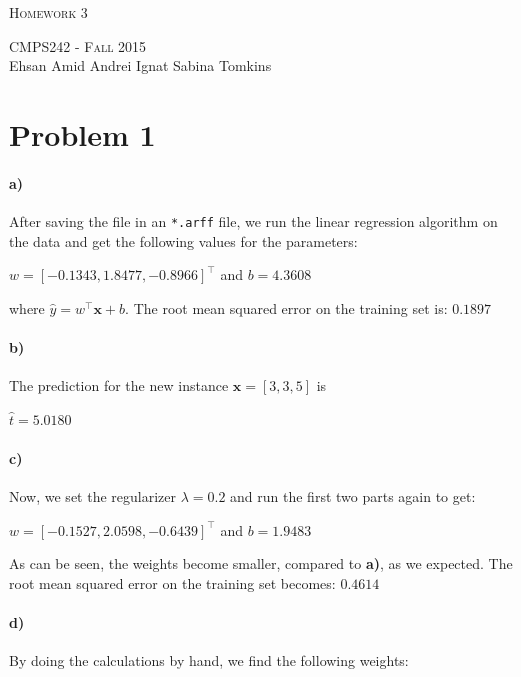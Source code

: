 \documentclass{article}
\begin{document}
\begin{center}
\Huge{\textsc{Homework 3}} 

\Large\textsc{CMPS242 - Fall 2015}\\

\large{Ehsan Amid \hfill Andrei Ignat  \hfill Sabina Tomkins} 
\end{center}

\section{Problem 1}

\paragraph{a)} After saving the file in an \texttt{*.arff} file, we run the linear regression algorithm on the data and get the following values for the parameters:

\begin{center}
$w = [-0.1343, 1.8477,  -0.8966]^\top$ and $b = 4.3608$ 
\end{center}
where $\hat{y} = w^\top \mathbf{x} + b$. The root mean squared error on the training set is: $0.1897$\newline

\paragraph{b)} The prediction for the new instance $\mathbf{x} = [3, 3, 5]$ is

\begin{center}
$\hat{t} = 5.0180$
\end{center}

\paragraph{c)} Now, we set the regularizer $\lambda = 0.2$ and run the first two parts again to get:

\begin{center}
$w = [-0.1527, 2.0598, -0.6439]^\top$ and $b = 1.9483$
\end{center}


As can be seen, the weights become smaller, compared to \textbf{a)}, as we expected. The root mean squared error on the training set becomes: $0.4614$

\paragraph{d)} By doing the calculations by hand, we find the following weights:
\end{document}
